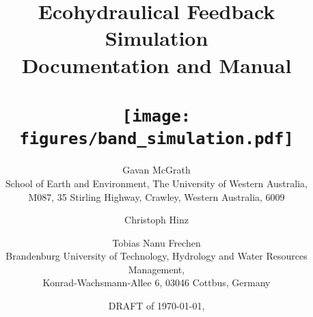 \documentclass[twoside,english]{article}
\begin{document}
\fancyheadoffset[LE,RO]{25pt}
\setlength{\headheight}{13pt}
\fancyhead[RO,RE,LE,LO]{}
\fancyhead[RO,LE]{\slshape \rightmark}
\fancyhead[RE,LO]{\slshape \leftmark}
\renewcommand{\headrulewidth}{0pt}




\title{\textbf{\huge Ecohydraulical Feedback Simulation}\\
\textbf{\huge Documentation and Manual}\\
\textbf{\huge \bigskip{}}\\
\textbf{\huge \texttt{[image: figures/band\_simulation.pdf]}}}

\author{Gavan McGrath\\
School of Earth and Environment, The University of Western Australia,\\
M087, 35 Stirling Highway, Crawley, Western Australia, 6009 \and
Christoph Hinz \and Tobias Nanu Frechen\\
Brandenburg University of Technology, Hydrology and Water Resources
Management, \\
Konrad-Wachsmann-Allee 6, 03046 Cottbus, Germany}


\date{DRAFT of \today  , \currenttime}

\maketitle
\thispagestyle{empty}
\pagestyle{empty}

\newpage{}

\cleardoublepage{}

\clearpage{}

\setlength{\parskipold}{\parskip}
\setlength{\parskip}{0.5ex}

\tableofcontents{}

\setlength{\parskip}{\parskipold}

\clearpage{}
\end{document}
